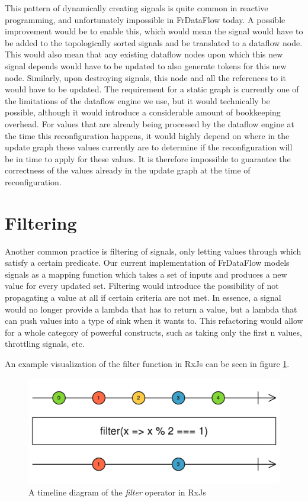 This pattern of dynamically creating signals is quite common in reactive programming, and unfortunately impossible in FrDataFlow today. A possible improvement would be to enable this, which would mean the signal would have to be added to the topologically sorted signals and be translated to a dataflow node. This would also mean that any existing dataflow nodes upon which this new signal depends would have to be updated to also generate tokens for this new node. Similarly, upon destroying signals, this node and all the references to it would have to be updated. The requirement for a static graph is currently one of the limitations of the dataflow engine we use, but it would technically be possible, although it would introduce a considerable amount of bookkeeping overhead. For values that are already being processed by the dataflow engine at the time this reconfiguration happens, it would highly depend on where in the update graph these values currently are to determine if the reconfiguration will be in time to apply for these values. It is therefore impossible to guarantee the correctness of the values already in the update graph at the time of reconfiguration. 

\section{Filtering}

Another common practice is filtering of signals, only letting values through which satisfy a certain predicate. Our current implementation of FrDataFlow models signals as a mapping function which takes a set of inputs and produces a new value for every updated set. Filtering would introduce the possibility of not propagating a value at all if certain criteria are not met. In essence, a signal would no longer provide a lambda that has to return a value, but a lambda that can push values into a type of sink when it wants to. This refactoring would allow for a whole category of powerful constructs, such as taking only the first n values, throttling signals, etc. 

An example visualization of the filter function in RxJs can be seen in figure  \ref{fig:futurework-filtering-filter}. 

\begin{figure}[h!]
	\includegraphics[width=\textwidth]{images/FutureWork-Filtering-Filter.png}
	\caption{A timeline diagram of the \textit{filter} operator in RxJs}
	\label{fig:futurework-filtering-filter}
\end{figure}

